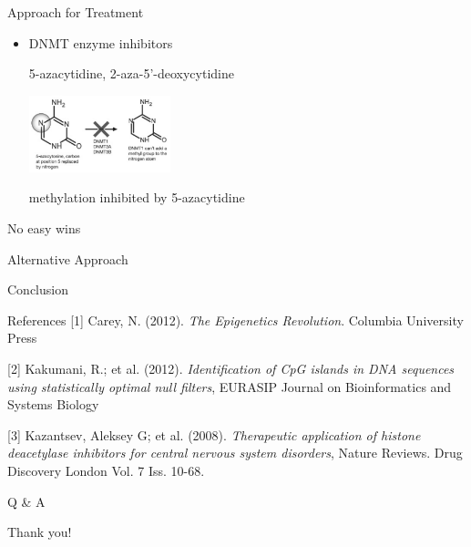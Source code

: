 \documentclass{beamer}
\begin{document}
    \begin{frame}{Approach for Treatment}
        \begin{itemize}
            \item DNMT enzyme inhibitors
            
                  {\small 5-azacytidine, 2-aza-5’-deoxycytidine}
                  
                  \vspace{2em}
                  \begin{center}
                    \includegraphics[height=6em]{5azcy-inh}
                    
                    {\footnotesize methylation inhibited by 5-azacytidine}
                  \end{center}
        \end{itemize}

    \end{frame}

    \begin{frame}{No easy wins}

    \end{frame}

    \begin{frame}{Alternative Approach}

    \end{frame}

    \begin{frame}{Conclusion}

    \end{frame}

    \begin{frame}{References}
        \footnotesize [1] Carey, N. (2012). \textit{The Epigenetics Revolution}. Columbia University Press
    
        \footnotesize [2] Kakumani, R.; et al. (2012). \textit{Identification of CpG islands in DNA sequences using statistically optimal null filters}, EURASIP Journal on Bioinformatics and Systems Biology 
    
        \footnotesize [3] Kazantsev, Aleksey G; et al. (2008). \textit{Therapeutic application of histone deacetylase inhibitors for central nervous system disorders}, Nature Reviews. Drug Discovery\; London Vol. 7 Iss. 10-68.
    \end{frame}

    \begin{frame}[plain]
        \centering
        \huge Q \& A
    \end{frame}

    \begin{frame}[plain]
        \centering
        \huge Thank you!
    \end{frame}
\end{document}
